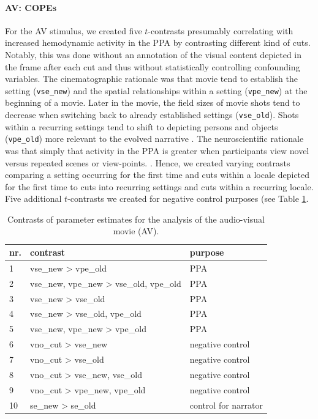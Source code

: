 \documentclass[english]{article}
\begin{document}
\paragraph{AV: COPEs}

For the AV stimulus, we created five $t$-contrasts presumably correlating with
increased hemodynamic activity in the PPA by contrasting different kind of cuts.
Notably, this was done without an annotation of the visual content depicted in
the frame after each cut and thus without statistically controlling confounding
variables.
The cinematographic rationale was that movie tend to establish the setting
(\texttt{vse\_new}) and the spatial relationships within a setting
(\texttt{vpe\_new}) at the beginning of a movie.
Later in the movie, the field sizes of movie shots tend to decrease when
switching back to already established settings (\texttt{vse\_old}).
Shots within a recurring settings tend to shift to depicting persons and objects
(\texttt{vpe\_old}) more relevant to the evolved narrative \citep{brown2012cinematography, mercado2011filmmakers}.
The neuroscientific rationale was that simply that activity in the PPA is
greater when participants view novel versus repeated scenes or view-points.
\citep{epstein1999parahippocampal}.
Hence, we created varying contrasts comparing a setting occurring for the first
time and cuts within a locale depicted for the first time to cuts into recurring
settings and cuts within a recurring locale.
Five additional $t$-contrasts we created for negative control purposes (see
Table \ref{tab:av-contrasts}.

\begin{table}[t]
    \caption{Contrasts of parameter estimates for the analysis of the audio-visual movie (AV).}
\label{tab:av-contrasts}
\footnotesize
\begin{tabular}{lll}
\toprule
\textbf{nr.} &  \textbf{contrast} & \textbf{purpose} \\
\midrule
1 & vse\_new > vpe\_old & PPA \tabularnewline
2 & vse\_new, vpe\_new > vse\_old, vpe\_old & PPA \tabularnewline
3 & vse\_new > vse\_old & PPA \tabularnewline
4 & vse\_new > vse\_old, vpe\_old & PPA \tabularnewline
5 & vse\_new, vpe\_new > vpe\_old & PPA \tabularnewline
6 & vno\_cut > vse\_new & negative control \tabularnewline
7 & vno\_cut > vse\_old & negative control \tabularnewline
8 & vno\_cut > vse\_new, vse\_old & negative control \tabularnewline
9 & vno\_cut > vpe\_new, vpe\_old & negative control \tabularnewline
10 & se\_new > se\_old & control for narrator \tabularnewline
\end{tabular}
\end{table}
\end{document}
